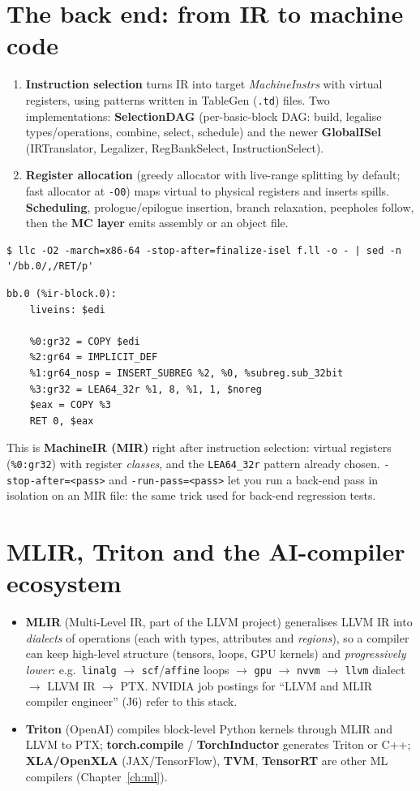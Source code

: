 \documentclass[10pt,a4paper,openany,oneside]{report}
\newcommand{\prio}[1]{\texorpdfstring{\ifcase#1\or{\color{gold}\ding{72}}\or{\color{gold}\ding{72}\ding{72}}\or{\color{gold}\ding{72}\ding{72}\ding{72}}\fi}{}}
\begin{document}
\section{The back end: from IR to machine code \prio{2}}
\begin{enumerate}[nosep]
\item \textbf{Instruction selection} turns IR into target \emph{MachineInstrs} with virtual registers, using patterns written in TableGen (\texttt{.td}) files. Two implementations: \textbf{SelectionDAG} (per-basic-block DAG: build, legalise types/operations, combine, select, schedule) and the newer \textbf{GlobalISel} (IRTranslator, Legalizer, RegBankSelect, InstructionSelect).
\item \textbf{Register allocation} (greedy allocator with live-range splitting by default; fast allocator at \texttt{-O0}) maps virtual to physical registers and inserts spills. \textbf{Scheduling}, prologue/epilogue insertion, branch relaxation, peepholes follow, then the \textbf{MC layer} emits assembly or an object file.
\end{enumerate}
\begin{lstlisting}[style=shcmd]
$ llc -O2 -march=x86-64 -stop-after=finalize-isel f.ll -o - | sed -n '/bb.0/,/RET/p'
\end{lstlisting}
\begin{lstlisting}[style=out]
  bb.0 (%ir-block.0):
    liveins: $edi
  
    %0:gr32 = COPY $edi
    %2:gr64 = IMPLICIT_DEF
    %1:gr64_nosp = INSERT_SUBREG %2, %0, %subreg.sub_32bit
    %3:gr32 = LEA64_32r %1, 8, %1, 1, $noreg
    $eax = COPY %3
    RET 0, $eax
\end{lstlisting}
This is \textbf{MachineIR (MIR)} right after instruction selection: virtual registers (\texttt{\%0:gr32}) with register \emph{classes}, and the \texttt{LEA64\_32r} pattern already chosen. \texttt{-stop-after=<pass>} and \texttt{-run-pass=<pass>} let you run a back-end pass in isolation on an MIR file: the same trick used for back-end regression tests.

\section{MLIR, Triton and the AI-compiler ecosystem \prio{2}}
\begin{itemize}[nosep]
\item \textbf{MLIR} (Multi-Level IR, part of the LLVM project) generalises LLVM IR into \emph{dialects} of operations (each with types, attributes and \emph{regions}), so a compiler can keep high-level structure (tensors, loops, GPU kernels) and \emph{progressively lower}: e.g.\ \texttt{linalg} $\to$ \texttt{scf}/\texttt{affine} loops $\to$ \texttt{gpu} $\to$ \texttt{nvvm} $\to$ \texttt{llvm} dialect $\to$ LLVM IR $\to$ PTX. NVIDIA job postings for ``LLVM and MLIR compiler engineer'' (J6) refer to this stack.
\item \textbf{Triton} (OpenAI) compiles block-level Python kernels through MLIR and LLVM to PTX; \textbf{torch.compile} / \textbf{TorchInductor} generates Triton or C++; \textbf{XLA/OpenXLA} (JAX/TensorFlow), \textbf{TVM}, \textbf{TensorRT} are other ML compilers (Chapter~\ref{ch:ml}).
\end{itemize}
\end{document}

